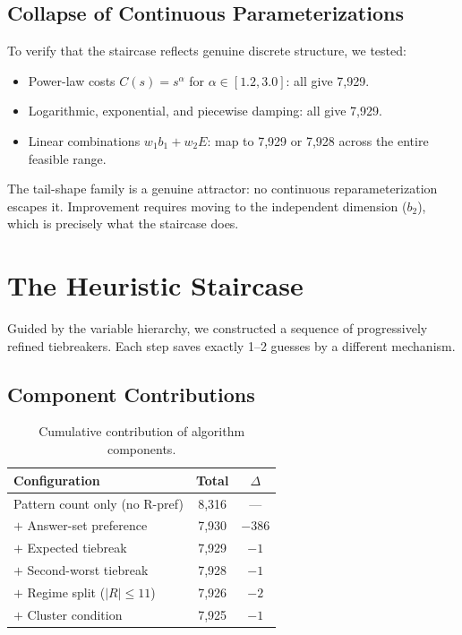 \documentclass[11pt]{article}
\begin{document}
	\subsection{Collapse of Continuous Parameterizations}
	
	To verify that the staircase reflects genuine discrete structure, we tested:
	\begin{itemize}[nosep]
		\item Power-law costs $C(s) = s^\alpha$ for $\alpha \in [1.2, 3.0]$: all give 7,929.
		\item Logarithmic, exponential, and piecewise damping: all give 7,929.
		\item Linear combinations $w_1 b_1 + w_2 E$: map to 7,929 or 7,928 across the entire feasible range.
	\end{itemize}
	
	The tail-shape family is a genuine attractor: no continuous reparameterization escapes it.  Improvement requires moving to the independent dimension ($b_2$), which is precisely what the staircase does.
	
	\section{The Heuristic Staircase}
	\label{sec:staircase}
	
	Guided by the variable hierarchy, we constructed a sequence of progressively refined tiebreakers.  Each step saves exactly 1--2 guesses by a different mechanism.
	
	\subsection{Component Contributions}
	
	\begin{table}[h]
		\centering
		\caption{Cumulative contribution of algorithm components.}
		\label{tab:cumulative}
		\begin{tabular}{@{}lcc@{}}
			\toprule
			Configuration & Total & $\Delta$ \\
			\midrule
			Pattern count only (no R-pref) & 8,316 & --- \\
			$+$ Answer-set preference & 7,930 & $-386$ \\
			$+$ Expected tiebreak & 7,929 & $-1$ \\
			$+$ Second-worst tiebreak & 7,928 & $-1$ \\
			$+$ Regime split ($|R| \leq 11$) & 7,926 & $-2$ \\
			$+$ Cluster condition & 7,925 & $-1$ \\
			\bottomrule
		\end{tabular}
	\end{table}
	
\end{document}
